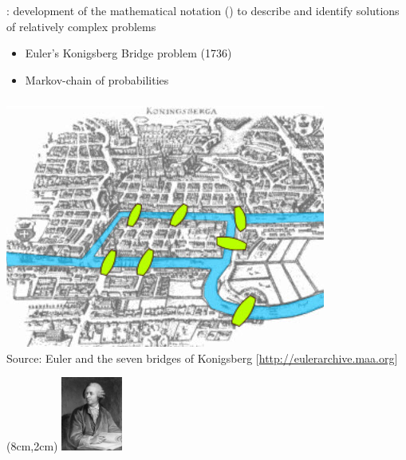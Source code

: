 \documentclass[8pt]{beamer}
\begin{document}
\begin{frame}
\frametitle{\insertsection}

{\color{blue}{Mathematics}}: development of the mathematical notation ({\color{blue}{graph theory}}) to describe and identify solutions of relatively complex problems
	\begin{itemize}
	\item Euler's Konigsberg Bridge problem (1736)
	\item Markov-chain of probabilities
	\end{itemize}	

\end{frame}



\begin{frame}
\frametitle{\insertsection}

\centering
\includegraphics[width=\linewidth,height=0.7\textheight,keepaspectratio]{konigsberg1}\\
\tiny{Source: Euler and the seven bridges of Konigsberg [\url{http://eulerarchive.maa.org}]}
	
\begin{textblock*}{6cm}(8cm,2cm)
\includegraphics[width=2cm]{Euler}
\end{textblock*}

\end{frame}
\end{document}
